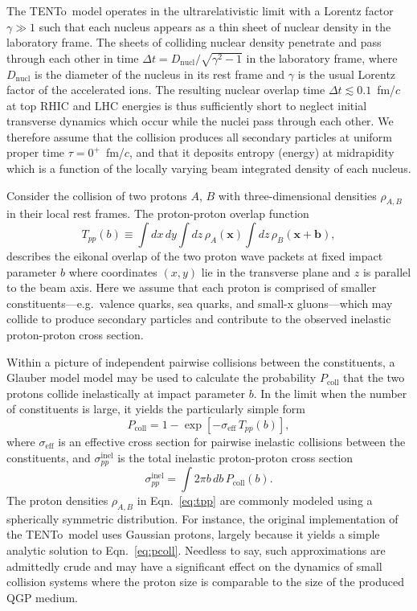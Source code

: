 \documentclass[aps,prc,reprint,amsmath,nofootinbib]{revtex4-1}
\newcommand{\trento}{T\raisebox{-0.5ex}{R}ENTo}
\newcommand{\x}{\mathbf{x}}
\def\\#1{ #1}
\begin{document}
The \trento\ model operates in the ultrarelativistic limit with a Lorentz factor $\gamma \gg 1$ such that each nucleus appears as a thin sheet of nuclear density in the laboratory frame.
The sheets of colliding nuclear density penetrate and pass through each other in time $\Delta t = D_\text{nucl} / \sqrt{\gamma^2 - 1}$ in the laboratory frame, where $D_\text{nucl}$ is the diameter of the nucleus in its rest frame and $\gamma$ is the usual Lorentz factor of the accelerated ions.
The resulting nuclear overlap time $\Delta t \lesssim 0.1$~fm/$c$ at top RHIC and LHC energies is thus sufficiently short to neglect initial transverse dynamics which occur while the nuclei pass through each other.
We therefore assume that the collision produces all secondary particles at uniform proper time $\tau = 0^+$~fm/$c$, and that it deposits entropy (energy) at midrapidity which is a function of the locally varying beam integrated density of each nucleus.

Consider the collision of two protons $A$, $B$ with three-dimensional densities $\rho_{A,B}$ in their local rest frames.
The proton-proton overlap function
\begin{equation}
  \label{eq:tpp}
  T_{pp}(b) \equiv \int dx\, dy \int dz\, \rho_A(\x) \int dz\, \rho_B(\x + \mathbf{b}),
\end{equation}
describes the eikonal overlap of the two proton wave packets at fixed impact parameter $b$ where coordinates $(x, y)$ lie in the transverse plane and $z$ is parallel to the beam axis.
Here we assume that each proton is comprised of smaller constituents---e.g.\ valence quarks, sea quarks, and small-x gluons---which may collide to produce secondary particles and contribute to the observed inelastic proton-proton cross section.

Within a picture of independent pairwise collisions between the constituents, a Glauber model model may be used to calculate the probability $P_\mathrm{coll}$ that the two protons collide inelastically at impact parameter $b$. In the limit when the number of constituents is large, it yields the particularly simple form
\begin{equation}
  \label{eq:pcoll}
  P_\mathrm{coll} = 1 - \exp[-\sigma_\mathrm{eff}\, T_{pp}(b)], \\
\end{equation}
where $\sigma_\mathrm{eff}$ is an effective cross section for pairwise inelastic collisions between the constituents, and $\sigma_{pp}^\mathrm{inel}$ is the total inelastic proton-proton cross section
\begin{equation}
  \label{eq:sigma_nn}
  \sigma_{pp}^\mathrm{inel} = \int 2 \pi b\, db\, P_\mathrm{coll}(b).
\end{equation}
The proton densities $\rho_{A,B}$ in Eqn.~\eqref{eq:tpp} are commonly modeled using a spherically symmetric distribution.
For instance, the original implementation of the \trento\ model uses Gaussian protons, largely because it yields a simple analytic solution to Eqn.~\eqref{eq:pcoll}.
Needless to say, such approximations are admittedly crude and may have a significant effect on the dynamics of small collision systems where the proton size is comparable to the size of the produced QGP medium.
\end{document}
